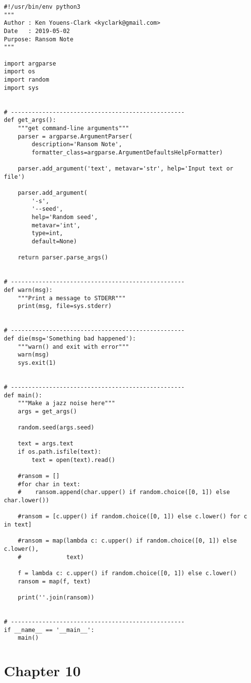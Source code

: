 \documentclass[]{article}
\begin{document}
\begin{verbatim}
#!/usr/bin/env python3
"""
Author : Ken Youens-Clark <kyclark@gmail.com>
Date   : 2019-05-02
Purpose: Ransom Note
"""

import argparse
import os
import random
import sys


# --------------------------------------------------
def get_args():
    """get command-line arguments"""
    parser = argparse.ArgumentParser(
        description='Ransom Note',
        formatter_class=argparse.ArgumentDefaultsHelpFormatter)

    parser.add_argument('text', metavar='str', help='Input text or file')

    parser.add_argument(
        '-s',
        '--seed',
        help='Random seed',
        metavar='int',
        type=int,
        default=None)

    return parser.parse_args()


# --------------------------------------------------
def warn(msg):
    """Print a message to STDERR"""
    print(msg, file=sys.stderr)


# --------------------------------------------------
def die(msg='Something bad happened'):
    """warn() and exit with error"""
    warn(msg)
    sys.exit(1)


# --------------------------------------------------
def main():
    """Make a jazz noise here"""
    args = get_args()

    random.seed(args.seed)

    text = args.text
    if os.path.isfile(text):
        text = open(text).read()

    #ransom = []
    #for char in text:
    #    ransom.append(char.upper() if random.choice([0, 1]) else char.lower())

    #ransom = [c.upper() if random.choice([0, 1]) else c.lower() for c in text]

    #ransom = map(lambda c: c.upper() if random.choice([0, 1]) else c.lower(),
    #             text)

    f = lambda c: c.upper() if random.choice([0, 1]) else c.lower()
    ransom = map(f, text)

    print(''.join(ransom))


# --------------------------------------------------
if __name__ == '__main__':
    main()
\end{verbatim}

\pagebreak

\hypertarget{chapter-10}{%
\section{Chapter 10}\label{chapter-10}}
\end{document}
